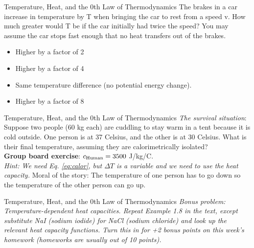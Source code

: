 \documentclass{beamer}
\begin{document}
\begin{frame}{Temperature, Heat, and the 0th Law of Thermodynamics}
The brakes in a car increase in temperature by T when bringing the car to rest from a speed v. How much greater would T be if the car initially had twice the speed? You may assume the car stops fast enough that no heat transfers out of the brakes.
\begin{itemize}
\item Higher by a factor of 2
\item Higher by a factor of 4
\item Same temperature difference (no potential energy change).
\item Higher by a factor of 8
\end{itemize}
\end{frame}

\begin{frame}{Temperature, Heat, and the 0th Law of Thermodynamics}
\textit{The survival situation}: Suppose two people (60 kg each) are cuddling to stay warm in a tent because it is cold outside.  One person is at 37 Celsius, and the other is at 30 Celsius.  What is their final temperature, assuming they are calorimetrically isolated? \\ \vspace{0.5cm}
\textbf{Group board exercise}: $c_{\rm Human} = 3500$ J/kg/C. \\ \vspace{0.5cm}
\textit{Hint: We need Eq. \ref{eq:calor}, but $\Delta T$ is a variable and we need to use the heat capacity.}
\alert{Moral of the story}: The temperature of one person has to go down so the temperature of the other person can go up. 
\end{frame}

\begin{frame}{Temperature, Heat, and the 0th Law of Thermodynamics}
\textit{{Bonus problem}: Temperature-dependent heat capacities.  Repeat Example 1.8 in the text, except substitute NaI (sodium iodide) for NaCl (sodium chloride) and look up the relevant heat capacity functions.  Turn this in for +2 bonus points on this week's homework (homeworks are usually out of 10 points).}
\end{frame}
\end{document}
